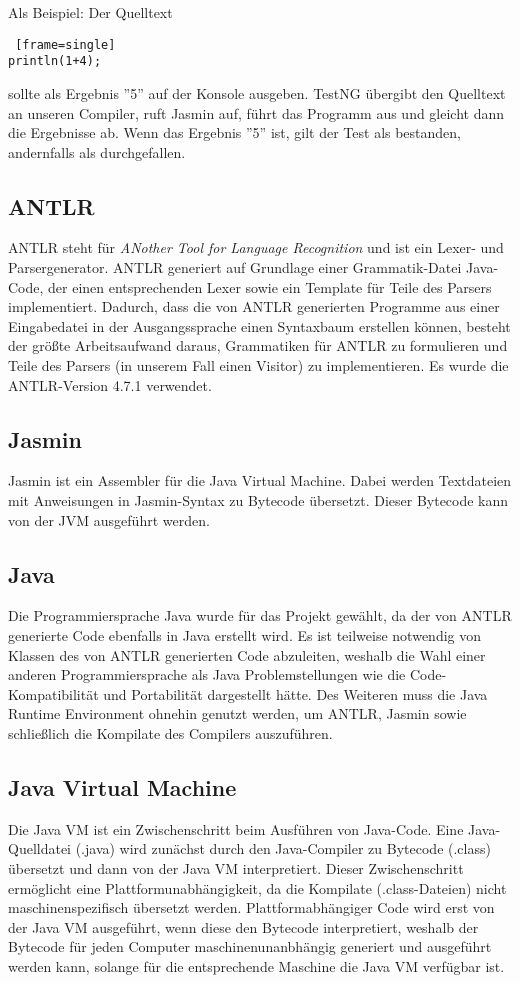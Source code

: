 \pagebreak
Als Beispiel: Der Quelltext
\begin{lstlisting} [frame=single]
println(1+4);
\end{lstlisting}

sollte als Ergebnis ''5'' auf der Konsole ausgeben. TestNG übergibt den Quelltext an unseren Compiler, ruft Jasmin auf, führt das Programm aus und gleicht dann die Ergebnisse ab. Wenn das Ergebnis ''5'' ist, gilt der Test als bestanden, andernfalls als durchgefallen. 

\subsection{ANTLR}
ANTLR steht für \textit{ANother Tool for Language Recognition} und ist ein Lexer- und Parsergenerator. ANTLR generiert auf Grundlage einer Grammatik-Datei Java-Code, der einen entsprechenden Lexer sowie ein Template für Teile des Parsers implementiert. Dadurch, dass die von ANTLR generierten Programme aus einer Eingabedatei in der Ausgangssprache einen Syntaxbaum erstellen können, besteht der größte Arbeitsaufwand daraus, Grammatiken für ANTLR zu formulieren und Teile des Parsers (in unserem Fall einen Visitor) zu implementieren. Es wurde die ANTLR-Version 4.7.1 verwendet.

\subsection{Jasmin}
Jasmin ist ein Assembler für die Java Virtual Machine. Dabei werden Textdateien mit Anweisungen in Jasmin-Syntax zu Bytecode übersetzt. Dieser Bytecode kann von der JVM ausgeführt werden.

\subsection{Java}
Die Programmiersprache Java wurde für das Projekt gewählt, da der von ANTLR generierte Code ebenfalls in Java erstellt wird. Es ist teilweise notwendig von Klassen des von ANTLR generierten Code abzuleiten, weshalb die Wahl einer anderen Programmiersprache als Java Problemstellungen wie die Code-Kompatibilität und Portabilität dargestellt hätte. 
Des Weiteren muss die Java Runtime Environment ohnehin genutzt werden, um ANTLR, Jasmin sowie schließlich die Kompilate des Compilers auszuführen.

\subsection{Java Virtual Machine}
Die Java VM ist ein Zwischenschritt beim Ausführen von Java-Code. Eine Java-Quelldatei (.java) wird zunächst durch den Java-Compiler zu Bytecode (.class) übersetzt und dann von der Java VM interpretiert. Dieser Zwischenschritt ermöglicht eine Plattformunabhängigkeit, da die Kompilate (.class-Dateien) nicht maschinenspezifisch übersetzt werden. Plattformabhängiger Code wird erst von der Java VM ausgeführt, wenn diese den Bytecode interpretiert, weshalb der Bytecode für jeden Computer maschinenunanbhängig generiert und ausgeführt werden kann, solange für die entsprechende Maschine die Java VM verfügbar ist.

